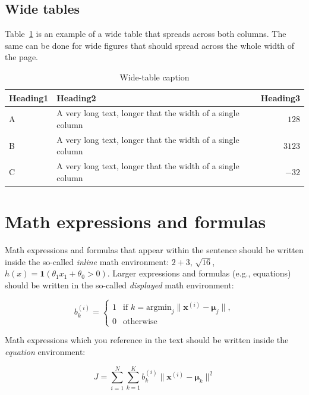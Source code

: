 \documentclass[10pt, a4paper]{article}
\begin{document}
\subsection{Wide tables}

Table~\ref{tab:wide-table} is an example of a wide table that spreads across both columns. The same can be done for wide figures that should spread across the whole width of the page.

\begin{table}
\caption{Wide-table caption}
\label{tab:wide-table}
\begin{center}
\begin{tabular}{llr}
\toprule
Heading1 & Heading2 & Heading3\\
\midrule
A & A very long text, longer that the width of a single column & $128$\\
B & A very long text, longer that the width of a single column & $3123$\\
C & A very long text, longer that the width of a single column & $-32$\\
\bottomrule
\end{tabular}
\end{center}
\end{table}

\section{Math expressions and formulas}

Math expressions and formulas that appear within the sentence should be written inside the so-called \emph{inline} math environment: $2+3$, $\sqrt{16}$, $h(x)=\mathbf{1}(\theta_1 x_1 + \theta_0>0)$. Larger expressions and formulas (e.g., equations) should be written in the so-called \emph{displayed} math environment:

\[
b^{(i)}_k = \begin{cases}
1 & \text{if
    $k = \text{argmin}_j \| \mathbf{x}^{(i)} - \mathbf{\mu}_j \|,$}\\
0 & \text{otherwise}
\end{cases}
\]

Math expressions which you reference in the text should be written inside the \textit{equation} environment:

\begin{equation}\label{eq:kmeans-error}
J = \sum_{i=1}^N \sum_{k=1}^K
b^{(i)}_k \| \mathbf{x}^{(i)} - \mathbf{\mu}_k \|^2
\end{equation}
\end{document}
